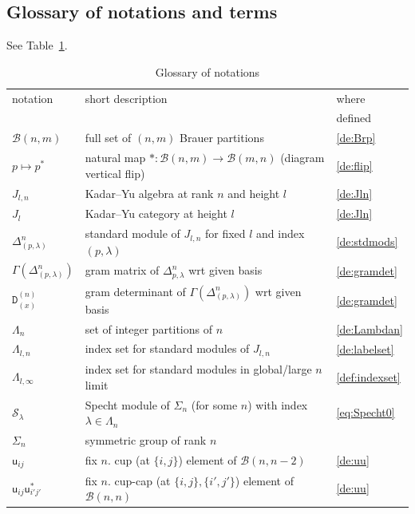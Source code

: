 \documentclass{article}
\newcommand{\ppm}[1]{\textcolor{red}{#1}}
\newcommand{\bajm}[1]{\textcolor{blue}{#1}}
\theoremstyle{definition}
\newcommand{\Deltaa}{\Delta}   %
\newcommand{\Deltaaa}[2]{\Deltaa^{#1}_{#2}}
\newcommand{\Delt}[2]{\Delta^{#1}_{(#2)}}  %
\newcommand{\Deltt}{{\mathtt D}}   %
\newcommand{\Delttt}[2]{\Deltt^{#1}_{(#2)}}  %
\newcommand{\Sym}{\Sigma}  %
\newcommand{\Sp}{{\mathfrak{S}}}  %
\def\uu{{\mathsf u}} %
\def\SS{\mathcal{S}} %
\def\l{\lambda}
\numberwithin{equation}{subsection}
\begin{document}
\medskip 


\subsection{Glossary of notations and terms}

See Table~\ref{tab:glossary}. 

\newcommand{\Brp}{{\mathcal B}}   %

\begin{table}[]
    \centering
    \begin{tabular}{l|l|l}
    notation & short description & where  \\  
     & & defined \\ \hline
    $\Brp(n,m) $ & full set of $(n,m)$ Brauer partitions  &  \ref{de:Brp} \\ 
    $p \mapsto p^*$ & natural map $*:\Brp(n,m) \rightarrow \Brp(m,n)$ (diagram vertical flip) & \ref{de:flip} \\ 
    $J_{l,n}$   &  Kadar--Yu algebra at rank $n$ and height $l$ & \ref{de:Jln} \\  
    $J_l$     &  Kadar--Yu category at height $l$  &   \ref{de:Jln} \\ 
     $\Deltaaa{n}{(p,\l)} $   &  standard module of $J_{l,n}$ for fixed $l$ and index $(p,\l)$ & \ref{de:stdmods} \\
     $ \Gamma(\Delt{n}{p,\l})  $ &  gram matrix of $\Deltaaa{n}{p,\l}$ wrt given basis & \ref{de:gramdet} \\ 
     $\Delttt{(n)}{x}$  & gram determinant of $ \Gamma(\Delt{n}{p,\l})  $ wrt given basis &\ref{de:gramdet} \\ 
     $\Lambda_n$ & set of integer partitions of $n$ &  \ref{de:Lambdan}  \\ 
     $\Lambda_{l,n}$ & index set for standard modules of $J_{l,n}$  & \ref{de:labelset}  \\ 
     $\Lambda_{l,\infty}$ & index set for standard modules in global/large $n$ limit  & \ref{def:indexset}  \\ 
     $\SS_\l$ & Specht module of $\Sym_n$ (for some $n$) with index $\l \in \Lambda_n$  &  \ref{eq:Specht0} \\ 
     $\Sym_n$ & symmetric group of rank $n$\\
     $\uu_{ij}$ & fix $n$. cup (at $\{i,j\}$) element of $\Brp(n,n-2)$  & \ref{de:uu} \\ 
     $\uu_{ij} \uu_{i'j'}^*$ & fix $n$. cup-cap (at $\{i,j\},\{ i',j' \}$) element of $\Brp(n,n)$  & \ref{de:uu} \\ 
    \end{tabular}
    \caption{Glossary of notations %
    } %
    \label{tab:glossary}
\end{table}
\end{document}
